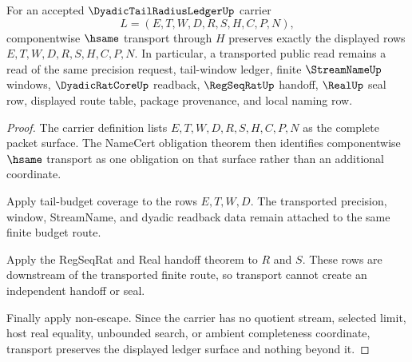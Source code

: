 \begin{theorem}
\label{thm:dyadic-tail-radius-ledger-transport-stability}
For an accepted $\DyadicTailRadiusLedgerUp$ carrier
$$
L=(E,T,W,D,R,S,H,C,P,N),
$$
componentwise $\hsame$ transport through $H$ preserves exactly the displayed rows $E,T,W,D,R,S,H,C,P,N$. In particular, a transported public read remains a read of the same precision request, tail-window ledger, finite $\StreamNameUp$ windows, $\DyadicRatCoreUp$ readback, $\RegSeqRatUp$ handoff, $\RealUp$ seal row, displayed route table, package provenance, and local naming row.
\end{theorem}
\begin{proof}
The carrier definition lists $E,T,W,D,R,S,H,C,P,N$ as the complete packet surface. The NameCert obligation theorem then identifies componentwise $\hsame$ transport as one obligation on that surface rather than an additional coordinate.

Apply tail-budget coverage to the rows $E,T,W,D$. The transported precision, window, StreamName, and dyadic readback data remain attached to the same finite budget route.

Apply the RegSeqRat and Real handoff theorem to $R$ and $S$. These rows are downstream of the transported finite route, so transport cannot create an independent handoff or seal.

Finally apply non-escape. Since the carrier has no quotient stream, selected limit, host real equality, unbounded search, or ambient completeness coordinate, transport preserves the displayed ledger surface and nothing beyond it.
\end{proof}

